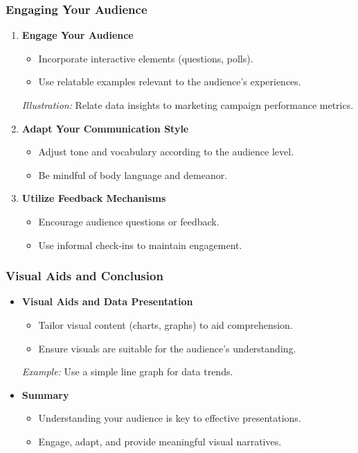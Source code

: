 \documentclass[aspectratio=169]{beamer}
\begin{document}
\begin{frame}[fragile]
    \frametitle{Engaging Your Audience}
    \begin{enumerate}[resume]
        \item \textbf{Engage Your Audience}
            \begin{itemize}
                \item Incorporate interactive elements (questions, polls).
                \item Use relatable examples relevant to the audience's experiences.
            \end{itemize}
            \textit{Illustration:} Relate data insights to marketing campaign performance metrics.
        
        \item \textbf{Adapt Your Communication Style}
            \begin{itemize}
                \item Adjust tone and vocabulary according to the audience level.
                \item Be mindful of body language and demeanor.
            \end{itemize}
        
        \item \textbf{Utilize Feedback Mechanisms}
            \begin{itemize}
                \item Encourage audience questions or feedback.
                \item Use informal check-ins to maintain engagement.
            \end{itemize}
    \end{enumerate}
\end{frame}

\begin{frame}[fragile]
    \frametitle{Visual Aids and Conclusion}
    \begin{itemize}
        \item \textbf{Visual Aids and Data Presentation}
            \begin{itemize}
                \item Tailor visual content (charts, graphs) to aid comprehension.
                \item Ensure visuals are suitable for the audience’s understanding.
            \end{itemize}
            \textit{Example:} Use a simple line graph for data trends.
        
        \item \textbf{Summary}
            \begin{itemize}
                \item Understanding your audience is key to effective presentations.
                \item Engage, adapt, and provide meaningful visual narratives.
            \end{itemize}
    \end{itemize}
\end{frame}
\end{document}
